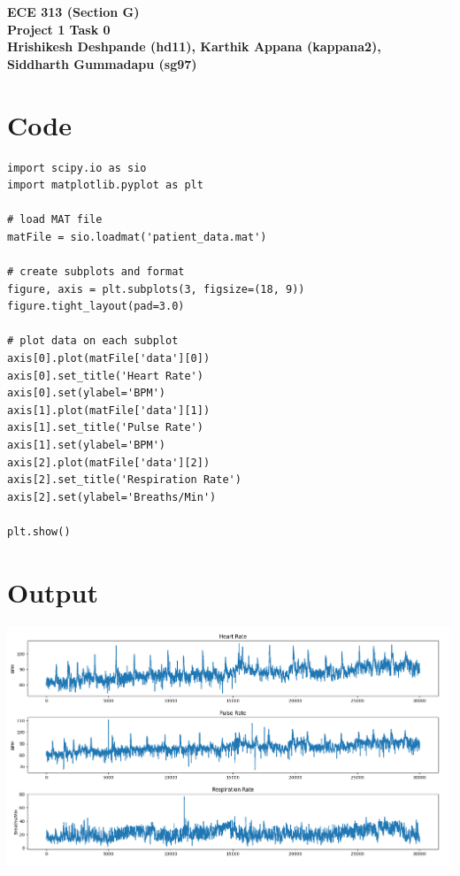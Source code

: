 \documentclass[12pt]{article}
\begin{document}
\onehalfspacing
\thispagestyle{firstpage}

\begin{center}
    {\Large \textbf{ECE 313 (Section G)}}\\[0.25in]
    {\Huge \textbf{Project 1 Task 0}}\\[0.25in]
    {\large \textbf{Hrishikesh Deshpande (hd11), Karthik Appana (kappana2), }\\[0.15in]}
    {\large \textbf{Siddharth Gummadapu (sg97)}}
\end{center}

\section*{Code}

\begin{verbatim}
import scipy.io as sio
import matplotlib.pyplot as plt

# load MAT file
matFile = sio.loadmat('patient_data.mat')

# create subplots and format
figure, axis = plt.subplots(3, figsize=(18, 9))
figure.tight_layout(pad=3.0)

# plot data on each subplot
axis[0].plot(matFile['data'][0])
axis[0].set_title('Heart Rate')
axis[0].set(ylabel='BPM')
axis[1].plot(matFile['data'][1])
axis[1].set_title('Pulse Rate')
axis[1].set(ylabel='BPM')
axis[2].plot(matFile['data'][2])
axis[2].set_title('Respiration Rate')
axis[2].set(ylabel='Breaths/Min')

plt.show()  
\end{verbatim}

\newpage

\section*{Output}

\includegraphics[scale=0.45]{plot.png}
\end{document}
